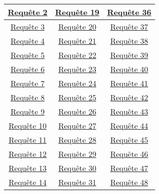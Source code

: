 \documentclass{report}
\begin{document}
\begin{table}[H]
	\center
	\begin{tabular}{|c|c|c|}
		\hline
		\href{run:./Images/TP5/tp5_2.png}{Requête 2} & \href{run:./Images/TP5/tp5_19.png}{Requête 19} & \href{run:./Images/TP5/tp5_36.png}{Requête 36} \\
		\hline
		\href{run:./Images/TP5/tp5_3.png}{Requête 3} & \href{run:./Images/TP5/tp5_20.png}{Requête 20} & \href{run:./Images/TP5/tp5_37.png}{Requête 37} \\
		\hline
		\href{run:./Images/TP5/tp5_4.png}{Requête 4} & \href{run:./Images/TP5/tp5_21.png}{Requête 21} & \href{run:./Images/TP5/tp5_38.png}{Requête 38} \\
		\hline
		\href{run:./Images/TP5/tp5_5.png}{Requête 5} & \href{run:./Images/TP5/tp5_22.png}{Requête 22} & \href{run:./Images/TP5/tp5_39.png}{Requête 39} \\
		\hline
		\href{run:./Images/TP5/tp5_6.png}{Requête 6} & \href{run:./Images/TP5/tp5_23.png}{Requête 23} & \href{run:./Images/TP5/tp5_40.png}{Requête 40} \\
		\hline
		\href{run:./Images/TP5/tp5_7.png}{Requête 7} & \href{run:./Images/TP5/tp5_24.png}{Requête 24} & \href{run:./Images/TP5/tp5_41.png}{Requête 41} \\
		\hline
		\href{run:./Images/TP5/tp5_8.png}{Requête 8} & \href{run:./Images/TP5/tp5_25.png}{Requête 25} & \href{run:./Images/TP5/tp5_42.png}{Requête 42} \\
		\hline
		\href{run:./Images/TP5/tp5_9.png}{Requête 9} & \href{run:./Images/TP5/tp5_26.png}{Requête 26} & \href{run:./Images/TP5/tp5_43.png}{Requête 43} \\
		\hline
		\href{run:./Images/TP5/tp5_10.png}{Requête 10} & \href{run:./Images/TP5/tp5_27.png}{Requête 27} & \href{run:./Images/TP5/tp5_44.png}{Requête 44} \\
		\hline
		\href{run:./Images/TP5/tp5_11.png}{Requête 11} & \href{run:./Images/TP5/tp5_28.png}{Requête 28} & \href{run:./Images/TP5/tp5_45.png}{Requête 45} \\
		\hline
		\href{run:./Images/TP5/tp5_12.png}{Requête 12} & \href{run:./Images/TP5/tp5_29.png}{Requête 29} & \href{run:./Images/TP5/tp5_46.png}{Requête 46} \\
		\hline
		\href{run:./Images/TP5/tp5_13.png}{Requête 13} & \href{run:./Images/TP5/tp5_30.png}{Requête 30} & \href{run:./Images/TP5/tp5_47.png}{Requête 47} \\
		\hline
		\href{run:./Images/TP5/tp5_14.png}{Requête 14} & \href{run:./Images/TP5/tp5_31.png}{Requête 31} & \href{run:./Images/TP5/tp5_48.png}{Requête 48} \\

\end{tabular}
\end{table}
\end{document}
